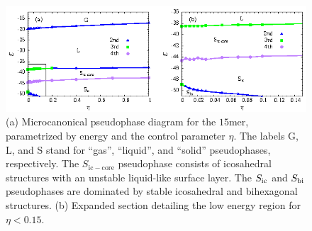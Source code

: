\documentclass[12pt]{report}
\begin{document}
%
\begin{figure}
\center
    \includegraphics[width=\textwidth]{chapter6Figs/phaseDiag15.eps}%
    \caption{\label{fig:phaseDiagram15} 
    (a) Microcanonical pseudophase diagram for the $15$mer,  parametrized by energy and the control parameter $\eta$. The labels G, L, and S stand for ``gas'', ``liquid'', and ``solid'' pseudophases, respectively. The $S_{\mathrm{ic-core}}$ pseudophase consists of icosahedral structures with an unstable liquid-like surface layer. The $S_{\rm ic}$ and $S_{\rm bi}$ pseudophases are dominated by stable icosahedral and bihexagonal structures. (b) Expanded section detailing the low energy region for $\eta < 0.15$.}
\end{figure}
%
\end{document}
